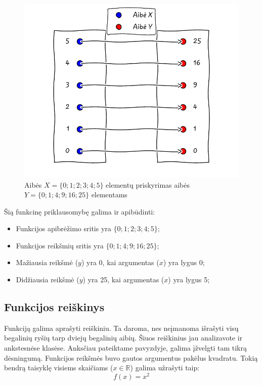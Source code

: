 \documentclass[nobib]{tufte-handout}
\begin{document}
\begin{figure}[!htpb]
  \includegraphics{./graphs/functions_as_graphs_example1.pdf}
  \caption{Aibės $X =\{0; 1; 2; 3; 4; 5\}$ elementų priskyrimas aibės $Y =\{0;
      1; 4; 9; 16; 25\}$ elementams}
  \label{fig:function_as_set_example}
\end{figure}

Šią funkcinę priklausomybę galima ir apibūdinti:
\begin{itemize}
  \item Funkcijos apibrėžimo sritis yra $\{0; 1; 2; 3; 4; 5\}$;
  \item Funkcijos reikšmių sritis yra $\{0; 1; 4; 9; 16; 25\}$;
  \item Mažiausia reikšmė ($y$) yra 0, kai argumentas ($x$) yra lygus 0;
  \item Didžiausia reikšmė ($y$) yra 25, kai argumentas ($x$) yra lygus 5;
\end{itemize}

\subsection{Funkcijos reiškinys}\label{sec:function_example}

Funkciją galima aprašyti reiškiniu. Ta daroma, nes neįmanoma išrašyti visų
begalinių ryšių tarp dviejų begalinių aibių. Šiuos reiškinius jau analizavote
ir ankstesnėse klasėse. Anksčiau pateiktame pavyzdyje, galima įžvelgti tam
tikrą dėsningumą. Funkcijos reikšmės buvo gautos argumentus pakėlus kvadratu.
Tokią bendrą taisyklę visiems skaičiams ($x\in \mathbb{R}$) galima užrašyti
taip:
$$f(x)=x^2$$
\end{document}
